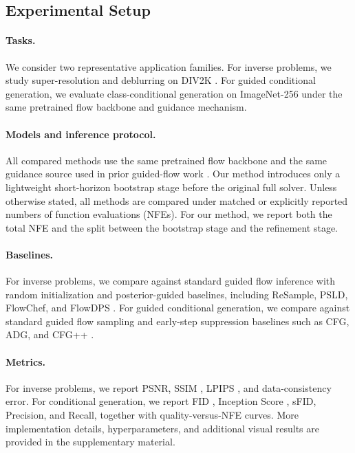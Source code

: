 \documentclass[letterpaper]{article} %
\begin{document}
\subsection{Experimental Setup}

\paragraph{Tasks.}
We consider two representative application families. For inverse problems, we study super-resolution and deblurring on DIV2K \citep{Agustsson_2017_CVPR_Workshops,Timofte_2017_CVPR_Workshops}. For guided conditional generation, we evaluate class-conditional generation on ImageNet-256 \citep{deng2009imagenet} under the same pretrained flow backbone and guidance mechanism.

\paragraph{Models and inference protocol.}
All compared methods use the same pretrained flow backbone and the same guidance source used in prior guided-flow work \citep{lipman2023flowmatching,flowdps2024,cfgzero2024}. Our method introduces only a lightweight short-horizon bootstrap stage before the original full solver. Unless otherwise stated, all methods are compared under matched or explicitly reported numbers of function evaluations (NFEs). For our method, we report both the total NFE and the split between the bootstrap stage and the refinement stage.

\paragraph{Baselines.}
For inverse problems, we compare against standard guided flow inference with random initialization
and posterior-guided baselines, including ReSample, PSLD, FlowChef, and FlowDPS \citep{flowdps2024}.
For guided conditional generation, we compare against standard guided flow sampling
and early-step suppression baselines such as CFG, ADG, and CFG++ \citep{cfgzero2024}.

\paragraph{Metrics.}
For inverse problems, we report PSNR, SSIM \citep{wang2004image}, LPIPS \citep{zhang2018unreasonable}, and data-consistency error. For conditional generation, we report FID \citep{heusel2017gans}, Inception Score \citep{salimans2016improved}, sFID, Precision, and Recall, together with quality-versus-NFE curves. More implementation details, hyperparameters, and additional visual results are provided in the supplementary material.
\end{document}
